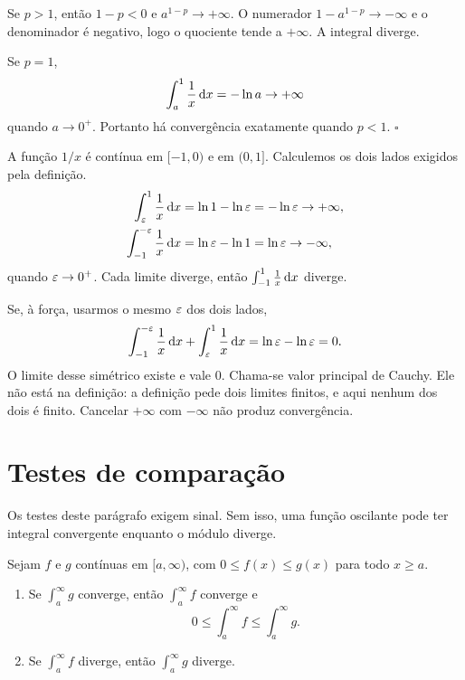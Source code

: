 \documentclass[11pt,a4paper]{article}
\begin{document}
Se \(p>1\), então \(1-p<0\) e \(a^{1-p}\to +\infty\). O numerador \(1-a^{1-p}\to-\infty\) e o denominador é negativo, logo o quociente tende a \(+\infty\). A integral diverge.

Se \(p=1\),
\[
\int_a^{1}\frac{1}{x}\,\mathrm{d} x=-\ln a\to+\infty
\]
quando \(a\to 0^{+}\). Portanto há convergência exatamente quando \(p<1\).
\hfill\(\square\)

\begin{contraexemplo}
A função \(1/x\) é contínua em \([-1,0)\) e em \((0,1]\). Calculemos os dois lados exigidos pela definição.
\begin{align*}
\int_{\varepsilon}^{1}\frac{1}{x}\,\mathrm{d} x
&=\ln 1-\ln\varepsilon=-\ln\varepsilon\to+\infty,\\
\int_{-1}^{-\varepsilon}\frac{1}{x}\,\mathrm{d} x
&=\ln\varepsilon-\ln 1=\ln\varepsilon\to-\infty,
\end{align*}
quando \(\varepsilon\to 0^{+}\). Cada limite diverge, então \(\int_{-1}^{1}\frac{1}{x}\,\mathrm{d} x\) diverge.

Se, à força, usarmos o mesmo \(\varepsilon\) dos dois lados,
\[
\int_{-1}^{-\varepsilon}\frac{1}{x}\,\mathrm{d} x+\int_{\varepsilon}^{1}\frac{1}{x}\,\mathrm{d} x
=\ln\varepsilon-\ln\varepsilon=0.
\]
O limite desse simétrico existe e vale \(0\). Chama-se valor principal de Cauchy. Ele não está na definição: a definição pede dois limites finitos, e aqui nenhum dos dois é finito. Cancelar \(+\infty\) com \(-\infty\) não produz convergência.
\end{contraexemplo}

\section{Testes de comparação}

Os testes deste parágrafo exigem sinal. Sem isso, uma função oscilante pode ter integral convergente enquanto o módulo diverge.

\begin{teorema}
Sejam \(f\) e \(g\) contínuas em \([a,\infty)\), com \(0\le f(x)\le g(x)\) para todo \(x\ge a\).
\begin{enumerate}
\item Se \(\int_a^{\infty} g\) converge, então \(\int_a^{\infty} f\) converge e
\[
0\le\int_a^{\infty} f\le\int_a^{\infty} g.
\]
\item Se \(\int_a^{\infty} f\) diverge, então \(\int_a^{\infty} g\) diverge.
\end{enumerate}
\end{teorema}
\end{document}
